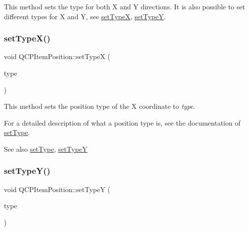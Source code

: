 This method sets the type for both X and Y directions. It is also possible to set different types for X and Y, see \mbox{\hyperlink{class_q_c_p_item_position_a2113b2351d6d00457fb3559a4e20c3ea}{set\+TypeX}}, \mbox{\hyperlink{class_q_c_p_item_position_ac2a454aa5a54c1615c50686601ec4510}{set\+TypeY}}. \mbox{\label{class_q_c_p_item_position_a2113b2351d6d00457fb3559a4e20c3ea}} 
\subsubsection{\texorpdfstring{setTypeX()}{setTypeX()}}
{\footnotesize\ttfamily void Q\+C\+P\+Item\+Position\+::set\+TypeX (\begin{DoxyParamCaption}\item[{\mbox{\hyperlink{class_q_c_p_item_position_aad9936c22bf43e3d358552f6e86dbdc8}{Q\+C\+P\+Item\+Position\+::\+Position\+Type}}}]{type }\end{DoxyParamCaption})}

This method sets the position type of the X coordinate to {\itshape type}.

For a detailed description of what a position type is, see the documentation of \mbox{\hyperlink{class_q_c_p_item_position_aa476abf71ed8fa4c537457ebb1a754ad}{set\+Type}}.

\begin{DoxySeeAlso}{See also}
\mbox{\hyperlink{class_q_c_p_item_position_aa476abf71ed8fa4c537457ebb1a754ad}{set\+Type}}, \mbox{\hyperlink{class_q_c_p_item_position_ac2a454aa5a54c1615c50686601ec4510}{set\+TypeY}} 
\end{DoxySeeAlso}
\mbox{\label{class_q_c_p_item_position_ac2a454aa5a54c1615c50686601ec4510}} 
\subsubsection{\texorpdfstring{setTypeY()}{setTypeY()}}
{\footnotesize\ttfamily void Q\+C\+P\+Item\+Position\+::set\+TypeY (\begin{DoxyParamCaption}\item[{\mbox{\hyperlink{class_q_c_p_item_position_aad9936c22bf43e3d358552f6e86dbdc8}{Q\+C\+P\+Item\+Position\+::\+Position\+Type}}}]{type }\end{DoxyParamCaption})}


